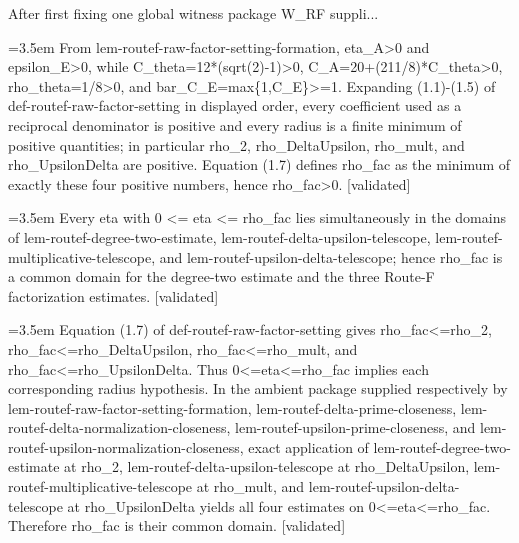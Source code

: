 \documentclass{article}
\newcommand{\step}[1]{\par\noindent\hangindent=3.5em\hangafter=1%
  \makebox[3.5em][l]{\textbf{#1.}}}
\newcommand{\steptag}[1]{\hfill{\small\textsf{[#1]}}}
\begin{document}
\begin{proofbox}{After first fixing one global witness package W\_RF suppli...}
\step{1.4.1} From lem-routef-raw-factor-setting-formation, eta\_A>0 and epsilon\_E>0, while C\_theta=12*(sqrt(2)-1)>0, C\_A=20+(211/8)*C\_theta>0, rho\_theta=1/8>0, and bar\_C\_E=max\{1,C\_E\}>=1. Expanding (1.1)-(1.5) of def-routef-raw-factor-setting in displayed order, every coefficient used as a reciprocal denominator is positive and every radius is a finite minimum of positive quantities; in particular rho\_2, rho\_DeltaUpsilon, rho\_mult, and rho\_UpsilonDelta are positive. Equation (1.7) defines rho\_fac as the minimum of exactly these four positive numbers, hence rho\_fac>0. \steptag{validated} \\[4pt]
\step{1.5} Every eta with 0 <= eta <= rho\_fac lies simultaneously in the domains of lem-routef-degree-two-estimate, lem-routef-delta-upsilon-telescope, lem-routef-multiplicative-telescope, and lem-routef-upsilon-delta-telescope; hence rho\_fac is a common domain for the degree-two estimate and the three Route-F factorization estimates. \steptag{validated} \\[6pt]
\step{1.5.1} Equation (1.7) of def-routef-raw-factor-setting gives rho\_fac<=rho\_2, rho\_fac<=rho\_DeltaUpsilon, rho\_fac<=rho\_mult, and rho\_fac<=rho\_UpsilonDelta. Thus 0<=eta<=rho\_fac implies each corresponding radius hypothesis. In the ambient package supplied respectively by lem-routef-raw-factor-setting-formation, lem-routef-delta-prime-closeness, lem-routef-delta-normalization-closeness, lem-routef-upsilon-prime-closeness, and lem-routef-upsilon-normalization-closeness, exact application of lem-routef-degree-two-estimate at rho\_2, lem-routef-delta-upsilon-telescope at rho\_DeltaUpsilon, lem-routef-multiplicative-telescope at rho\_mult, and lem-routef-upsilon-delta-telescope at rho\_UpsilonDelta yields all four estimates on 0<=eta<=rho\_fac. Therefore rho\_fac is their common domain. \steptag{validated} \\[4pt]
\end{proofbox}
\end{document}

